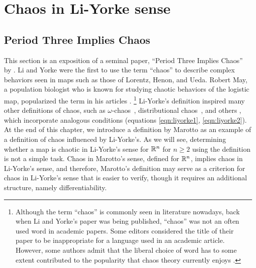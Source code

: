 \documentclass[12pt,draft,twoside]{book}
\begin{document}
\chapter{Chaos in Li-Yorke sense}

\section{Period Three Implies Chaos}
This section is an exposition of a seminal paper, ``Period Three Implies Chaos'' by \citet{li-yorke}.
Li and Yorke were the first to use the term ``chaos'' to describe complex behaviors seen in maps such as those of Lorentz, Henon, and Ueda.
Robert May, a population biologist who is known for studying chaotic behaviors of the logistic map, popularized the term in his articles \citeyearpar{may1,may2}.
\footnote{
  Although the term ``chaos'' is commonly seen in literature nowadays, back when Li and Yorke's paper was being published, ``chaos'' was not an often used word in academic papers.
  Some editors considered the title of their paper to be inappropriate for a language used in an academic article.
  However, some authors admit that the liberal choice of word has to some extent contributed to the popularity that chaos theory currently enjoys \citep[``Exploring Chaos on an Interval'']{ueda-abraham}.}
Li-Yorke's definition inspired many other definitions of chaos, such as $\omega$-chaos~\citep{omegachaos}, distributional chaos~\citep{dchaos1}, and others \citep{genericchaos,densechaos,extremechaos}, which incorporate analogous conditions (equations \ref{eqn:liyorke1}, \ref{eqn:liyorke2}).
At the end of this chapter, we introduce a definition by Marotto as an example of a definition of chaos influenced by Li-Yorke's.
As we will see, determining whether a map is chaotic in Li-Yorke's sense for $\mathbb{R}^n$ for $n \geq 2$ using the definition is not a simple task.
Chaos in Marotto's sense, defined for $\mathbb{R}^n$, implies chaos in Li-Yorke's sense, and therefore, Marotto's definition may serve as a criterion for chaos in Li-Yorke's sense that is easier to verify, though it requires an additional structure, namely differentiability.

\end{document}
